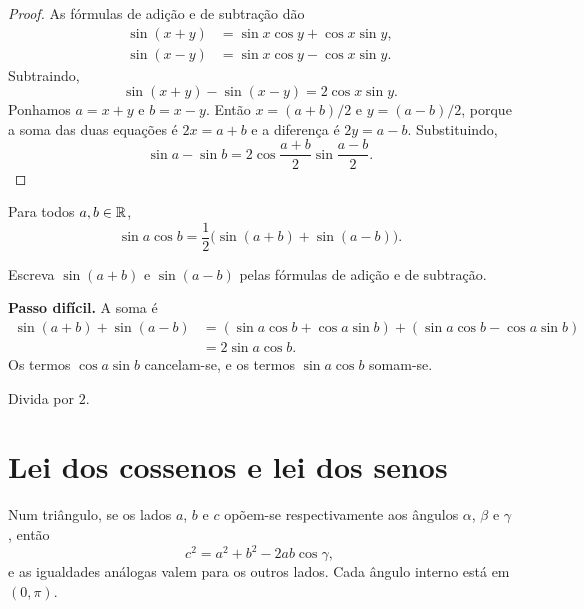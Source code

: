 \documentclass[11pt,a4paper]{article}
\begin{document}
\begin{proof}
As fórmulas de adição e de subtração dão
\begin{align*}
\sin(x+y)&=\sin x\cos y+\cos x\sin y,\\
\sin(x-y)&=\sin x\cos y-\cos x\sin y.
\end{align*}
Subtraindo,
\[
\sin(x+y)-\sin(x-y)=2\cos x\sin y.
\]
Ponhamos $a=x+y$ e $b=x-y$. Então $x=(a+b)/2$ e $y=(a-b)/2$, porque a soma das duas equações é $2x=a+b$ e a diferença é $2y=a-b$. Substituindo,
\[
\sin a-\sin b=2\cos\frac{a+b}{2}\sin\frac{a-b}{2}.
\]
\end{proof}

\begin{lema}\label{lem:produto}
Para todos $a,b\in\mathbb{R}$,
\[
\sin a\cos b=\frac12\bigl(\sin(a+b)+\sin(a-b)\bigr).
\]
\end{lema}

\begin{esqueleto}
\item Escreva $\sin(a+b)$ e $\sin(a-b)$ pelas fórmulas de adição e de subtração.
\item \textbf{Passo difícil.} A soma é
\begin{align*}
\sin(a+b)+\sin(a-b)
&=(\sin a\cos b+\cos a\sin b)+(\sin a\cos b-\cos a\sin b)\\
&=2\sin a\cos b.
\end{align*}
Os termos $\cos a\sin b$ cancelam-se, e os termos $\sin a\cos b$ somam-se.
\item Divida por $2$.
\end{esqueleto}

\section{Lei dos cossenos e lei dos senos}

\begin{teorema}\label{teo:cossenos}
Num triângulo, se os lados $a$, $b$ e $c$ opõem-se respectivamente aos ângulos $\alpha$, $\beta$ e $\gamma$, então
\[
c^2=a^2+b^2-2ab\cos\gamma,
\]
e as igualdades análogas valem para os outros lados. Cada ângulo interno está em $(0,\pi)$.
\end{teorema}
\end{document}

